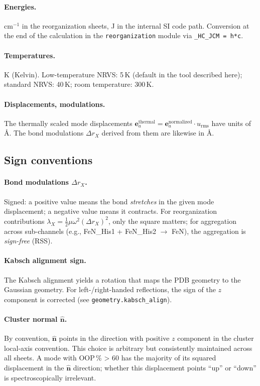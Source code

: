 \documentclass[11pt,a4paper,twoside]{article}
\providecommand{\angstrom}{\text{\AA}}    %
\theoremstyle{remark}
\begin{document}
\paragraph{Energies.}
cm$^{-1}$ in the reorganization sheets, J in the internal SI code
path. Conversion at the end of the calculation in the
\texttt{reorganization} module via \verb|_HC_JCM = h*c|.

\paragraph{Temperatures.}
K (Kelvin). Low-temperature NRVS: 5\,K (default in the tool
described here); standard NRVS: 40\,K; room temperature: 300\,K.

\paragraph{Displacements, modulations.}
The thermally scaled mode displacements
$\mathbf{e}_a^\text{thermal} = \mathbf{e}_a^\text{normalized} \cdot
u_\text{rms}$ have units of $\angstrom$. The bond modulations
$\Delta r_X$ derived from them are likewise in $\angstrom$.

\subsection{Sign conventions}

\paragraph{Bond modulations $\Delta r_X$.}
Signed: a positive value means the bond \emph{stretches} in the
given mode displacement; a negative value means it contracts. For
reorganization contributions $\lambda_X = \tfrac{1}{2}\mu\omega^2
(\Delta r_X)^2$, only the square matters; for aggregation across
sub-channels (e.g., FeN\_His1 + FeN\_His2 $\to$ FeN), the
aggregation is \emph{sign-free} (RSS).

\paragraph{Kabsch alignment sign.}
The Kabsch alignment yields a rotation that maps the PDB geometry
to the Gaussian geometry. For left-/right-handed reflections, the
sign of the $z$ component is corrected (see
\texttt{geometry.kabsch\_align}).

\paragraph{Cluster normal $\hat{\mathbf{n}}$.}
By convention, $\hat{\mathbf{n}}$ points in the direction with
positive $z$ component in the cluster local-axis convention. This
choice is arbitrary but consistently maintained across all
sheets. A mode with OOP\,\% > 60 has the majority of its squared
displacement in the $\hat{\mathbf{n}}$ direction; whether this
displacement points ``up'' or ``down'' is spectroscopically
irrelevant.
\end{document}
